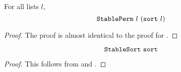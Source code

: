 \documentclass[sigplan,10pt,anonymous,review]{thesis}
\begin{document}
\begin{theorem}
  For all lists $l$,
  \begin{equation*}
    \texttt{\textup{StablePerm}}~l~(\texttt{\textup{sort}}~l)
  \end{equation*}
\end{theorem}
\begin{proof}
  The proof is almost identical to the proof for .
\end{proof}

\begin{theorem}
  \begin{equation*}
    \texttt{\textup{StableSort}}~\texttt{\textup{sort}}
  \end{equation*}
\end{theorem}
\begin{proof}
  This follows from  and .
\end{proof}

\section{}
\label{appendix:hdsort_sorted_S}
\end{document}
